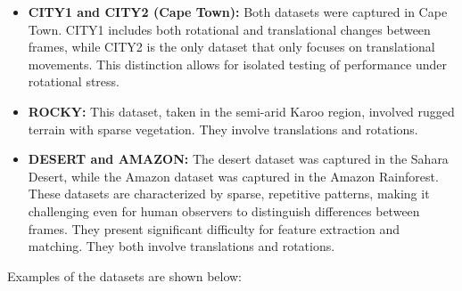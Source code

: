 \begin{itemize}
    \item \textbf{CITY1 and CITY2 (Cape Town):}  
    Both datasets were captured in Cape Town. CITY1 includes both rotational and translational changes between frames, while CITY2 is the only dataset that only focuses on translational movements. This distinction allows for isolated testing of performance under rotational stress.
    
    \item \textbf{ROCKY:}  
    This dataset, taken in the semi-arid Karoo region, involved rugged terrain with sparse vegetation. They involve translations and rotations. 
    
    \item \textbf{DESERT and AMAZON:}  
    The desert dataset was captured in the Sahara Desert, while the Amazon dataset was captured in the Amazon Rainforest. These datasets are characterized by sparse, repetitive patterns, making it challenging even for human observers to distinguish differences between frames. They present significant difficulty for feature extraction and matching. They both involve translations and rotations.
\end{itemize}

Examples of the datasets are shown below:

